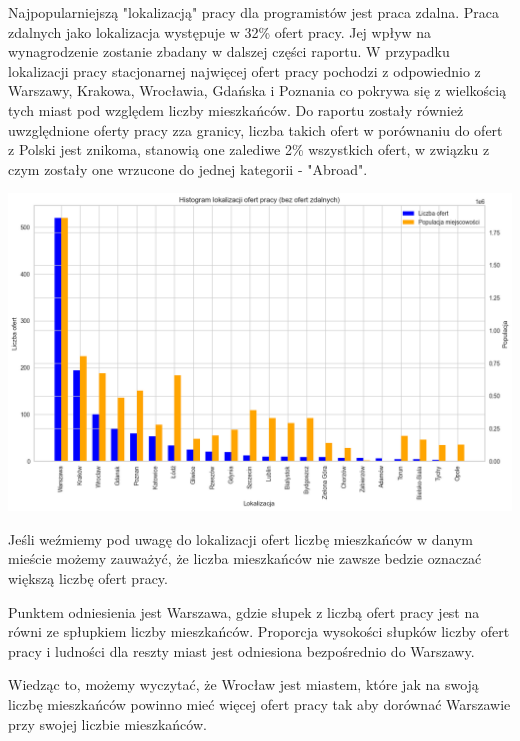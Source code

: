 \documentclass{article}
\begin{document}
Najpopularniejszą "lokalizacją" pracy dla programistów jest praca zdalna.
Praca zdalnych jako lokalizacja występuje w 32\% ofert pracy. Jej wpływ na wynagrodzenie
zostanie zbadany w dalszej części raportu.
W przypadku lokalizacji pracy stacjonarnej najwięcej ofert pracy pochodzi z odpowiednio z
Warszawy, Krakowa, Wrocławia, Gdańska i Poznania co pokrywa się z wielkością tych miast
pod względem liczby mieszkańców.
Do raportu zostały również uwzględnione oferty pracy zza granicy, liczba takich ofert
w porównaniu do ofert z Polski jest znikoma, stanowią one zalediwe 2\% wszystkich ofert,
w związku z czym zostały one wrzucone do jednej kategorii - "Abroad".

\begin{center}
    \includegraphics[scale=0.5]{img/location_with_pop.png}
\end{center}

Jeśli weźmiemy pod uwagę do lokalizacji ofert liczbę mieszkańców w danym mieście
możemy zauważyć, że liczba mieszkańców nie zawsze bedzie oznaczać większą liczbę ofert pracy.

Punktem odniesienia jest Warszawa, gdzie słupek z liczbą ofert pracy jest na równi ze spłupkiem
liczby mieszkańców.
Proporcja wysokości słupków liczby ofert pracy i ludności dla reszty miast jest odniesiona
bezpośrednio do Warszawy.

Wiedząc to, możemy wyczytać, że Wrocław jest miastem, które jak na swoją liczbę mieszkańców
powinno mieć więcej ofert pracy tak aby dorównać Warszawie przy swojej liczbie mieszkańców.
\end{document}
